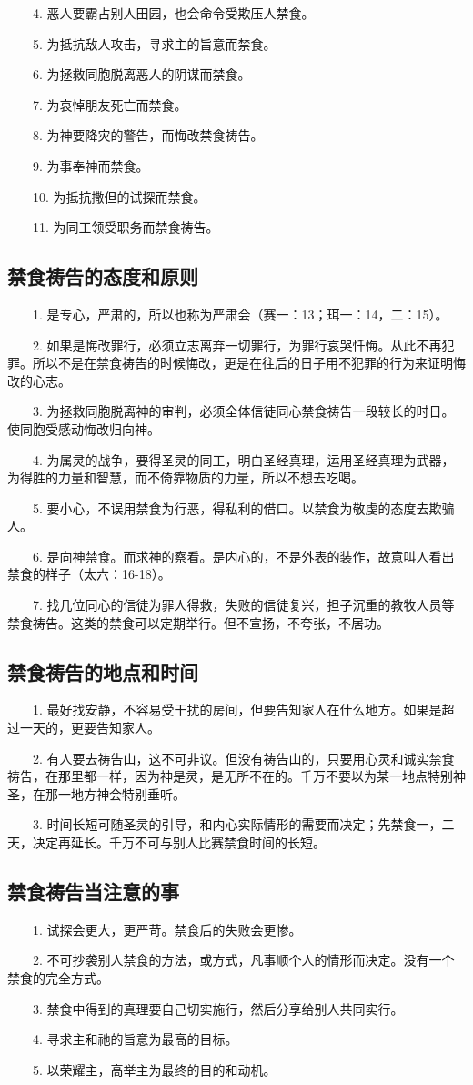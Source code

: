 　　4. 恶人要霸占别人田园，也会命令受欺压人禁食。

　　5. 为抵抗敌人攻击，寻求主的旨意而禁食。

　　6. 为拯救同胞脱离恶人的阴谋而禁食。

　　7. 为哀悼朋友死亡而禁食。

　　8. 为神要降灾的警告，而悔改禁食祷告。

　　9. 为事奉神而禁食。

　　10. 为抵抗撒但的试探而禁食。

　　11. 为同工领受职务而禁食祷告。

\subsection{禁食祷告的态度和原则}
　　1. 是专心，严肃的，所以也称为严肃会（赛一：13；珥一：14，二：15）。

　　2. 如果是悔改罪行，必须立志离弃一切罪行，为罪行哀哭忏悔。从此不再犯罪。所以不是在禁食祷告的时候悔改，更是在往后的日子用不犯罪的行为来证明悔改的心志。

　　3. 为拯救同胞脱离神的审判，必须全体信徒同心禁食祷告一段较长的时日。使同胞受感动悔改归向神。

　　4. 为属灵的战争，要得圣灵的同工，明白圣经真理，运用圣经真理为武器，为得胜的力量和智慧，而不倚靠物质的力量，所以不想去吃喝。

　　5. 要小心，不误用禁食为行恶，得私利的借口。以禁食为敬虔的态度去欺骗人。

　　6. 是向神禁食。而求神的察看。是内心的，不是外表的装作，故意叫人看出禁食的样子（太六：16-18）。

　　7. 找几位同心的信徒为罪人得救，失败的信徒复兴，担子沉重的教牧人员等禁食祷告。这类的禁食可以定期举行。但不宣扬，不夸张，不居功。

\subsection{禁食祷告的地点和时间}
　　1. 最好找安静，不容易受干扰的房间，但要告知家人在什么地方。如果是超过一天的，更要告知家人。

　　2. 有人要去祷告山，这不可非议。但没有祷告山的，只要用心灵和诚实禁食祷告，在那里都一样，因为神是灵，是无所不在的。千万不要以为某一地点特别神圣，在那一地方神会特别垂听。

　　3. 时间长短可随圣灵的引导，和内心实际情形的需要而决定；先禁食一，二天，决定再延长。千万不可与别人比赛禁食时间的长短。

\subsection{禁食祷告当注意的事}
　　1. 试探会更大，更严苛。禁食后的失败会更惨。

　　2. 不可抄袭别人禁食的方法，或方式，凡事顺个人的情形而决定。没有一个禁食的完全方式。

　　3. 禁食中得到的真理要自己切实施行，然后分享给别人共同实行。

　　4. 寻求主和祂的旨意为最高的目标。

　　5. 以荣耀主，高举主为最终的目的和动机。